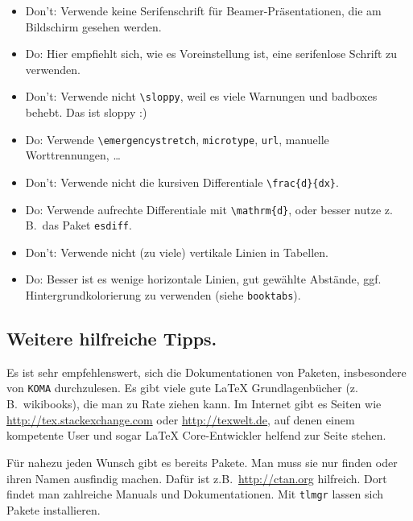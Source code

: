\documentclass[11pt,
               a4paper,
               parskip=half,
               ]{scrartcl}
\newcommand{\zB}{z.\,B.\xspace}
\newcommand{\textsw}[1]{\texttt{#1}} %
\begin{document}
\begin{itemize}
  \item Don't: Verwende keine Serifenschrift für Beamer-Präsentationen,
    die am Bildschirm gesehen werden.
  \item Do: Hier empfiehlt sich, wie es Voreinstellung ist,
    eine serifenlose Schrift zu verwenden.
\end{itemize}

\begin{itemize}
  \item Don't: Verwende nicht \verb+\sloppy+,
    weil es viele Warnungen und badboxes behebt. Das ist sloppy :)
  \item Do: Verwende \verb+\emergencystretch+, \textsw{microtype}, \textsw{url},
    manuelle Worttrennungen, \dots
\end{itemize}

\begin{itemize}
  \item Don't: Verwende nicht die kursiven Differentiale \verb+\frac{d}{dx}+.
  \item Do: Verwende aufrechte Differentiale mit \verb+\mathrm{d}+,
    oder besser nutze \zB~das Paket \textsw{esdiff}.
\end{itemize}   

\begin{itemize}
  \item Don't: Verwende nicht (zu viele) vertikale Linien in Tabellen. 
  \item Do: Besser ist es wenige horizontale Linien, gut gewählte Abstände,
    ggf. Hintergrundkolorierung zu verwenden (siehe \textsw{booktabs}).
\end{itemize}  

\subsection{Weitere hilfreiche Tipps.}   
Es ist sehr empfehlenswert, sich die Dokumentationen von Paketen,
insbesondere von \textsw{KOMA} durchzulesen.
Es gibt viele gute \LaTeX{} Grundlagenbücher (\zB~wikibooks),
die man zu Rate ziehen kann.
Im Internet gibt es Seiten wie \url{http://tex.stackexchange.com}
oder \url{http://texwelt.de}, auf denen einem kompetente User
und sogar \LaTeX{} Core-Entwickler helfend zur Seite stehen.

Für nahezu jeden Wunsch gibt es bereits Pakete.
Man muss sie nur finden oder ihren Namen ausfindig machen.
Dafür ist z.B.~\url{http://ctan.org} hilfreich.
Dort findet man zahlreiche Manuals und Dokumentationen.
Mit \textsw{tlmgr} lassen sich Pakete installieren.
\end{document}
